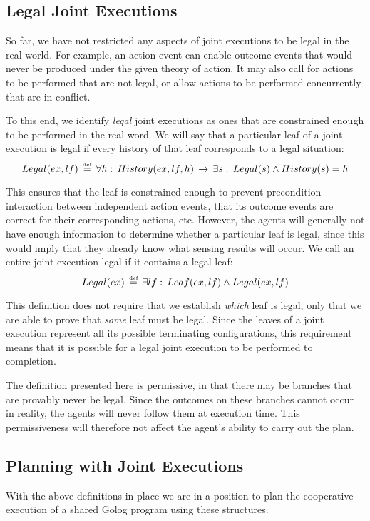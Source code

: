 \subsection{Legal Joint Executions}

So far, we have not restricted any aspects of joint executions to
be legal in the real world. For example, an action event can enable
outcome events that would never be produced under the given theory
of action. It may also call for actions to be performed that are not
legal, or allow actions to be performed concurrently that are in conflict.

To this end, we identify \emph{legal} joint executions as ones that
are constrained enough to be performed in the real word. We will say
that a particular leaf of a joint execution is legal if every history
of that leaf corresponds to a legal situation:\[
Legal(ex,lf)\,\stackrel{\mbox{\tiny def}}{=}\,\forall h:\, History(ex,lf,h)\,\rightarrow\,\exists s:\, Legal(s)\wedge History(s)=h\]


This ensures that the leaf is constrained enough to prevent precondition
interaction between independent action events, that its outcome events
are correct for their corresponding actions, etc. However, the agents
will generally not have enough information to determine whether a
particular leaf is legal, since this would imply that they already
know what sensing results will occur. We call an entire joint execution
legal if it contains a legal leaf:\[
Legal(ex)\,\stackrel{\mbox{\tiny def}}{=}\,\exists lf:\, Leaf(ex,lf)\wedge Legal(ex,lf)\]


This definition does not require that we establish \emph{which} leaf
is legal, only that we are able to prove that \emph{some} leaf must
be legal. Since the leaves of a joint execution represent all its
possible terminating configurations, this requirement means that it
is possible for a legal joint execution to be performed to completion.

The definition presented here is permissive, in that there may be
branches that are provably never be legal. Since the outcomes on these
branches cannot occur in reality, the agents will never follow them
at execution time. This permissiveness will therefore not affect the
agent's ability to carry out the plan.


\subsection{Planning with Joint Executions}

With the above definitions in place we are in a position to plan the
cooperative execution of a shared Golog program using these structures.

